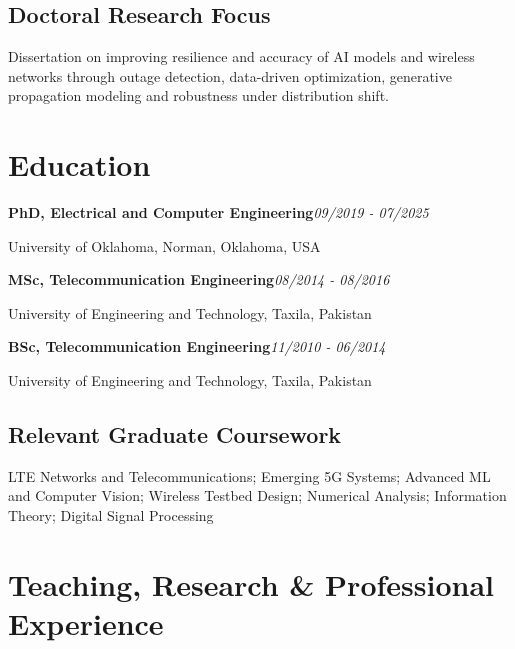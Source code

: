 \documentclass[9pt,letterpaper]{extarticle}
\newcommand{\entry}[2]{\Needspace{4\baselineskip}\textbf{#1}\hfill\textit{#2}\par}
\begin{document}
\subsection{Doctoral Research Focus}
Dissertation on improving resilience and accuracy of AI models and wireless networks through outage detection, data-driven optimization, generative propagation modeling and robustness under distribution shift.\par
{}
\section{Education}
\entry{PhD, Electrical and Computer Engineering}{09/2019 - 07/2025}
University of Oklahoma, Norman, Oklahoma, USA\par
\entry{MSc, Telecommunication Engineering}{08/2014 - 08/2016}
University of Engineering and Technology, Taxila, Pakistan\par
\entry{BSc, Telecommunication Engineering}{11/2010 - 06/2014}
University of Engineering and Technology, Taxila, Pakistan\par
{}
\subsection{Relevant Graduate Coursework}
LTE Networks and Telecommunications; Emerging 5G Systems; Advanced ML and Computer Vision; Wireless Testbed Design; Numerical Analysis; Information Theory; Digital Signal Processing\par
{}
\section{Teaching, Research \& Professional Experience}
\end{document}
